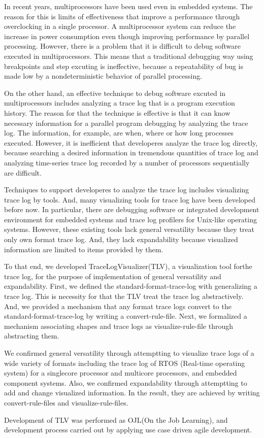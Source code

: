 In recent years, multiprocessors have been used even in embedded systems.
The reason for this is limits of effectiveness that improve a performance through overclocking in a single processor.
A multiprocessor system can reduce the increase in power consumption even though improving performance by parallel processing.
However, there is a problem that it is difficult to debug software executed in multiprocessors.
This means that a traditional debugging way using breakpoints and step excuting is ineffective, because a repeatability of bug is made low by a nondeterministic behavior of parallel processing.

On the other hand, an effective technique to debug software excuted in multiprocessors includes analyzing a trace log that is a program execution history.
The reason for that the technique is effective is that it can know necessary information for a parallel program debugging by analyzing the trace log.
The information, for example, are when, where or how long processes executed.
However, it is inefficient that developeres analyze the trace log directly, because searching a desired information in tremendous quantities of trace log and analyzing time-series trace log recorded by a number of processors sequentially are difficult.

Techniques to support developeres to analyze the trace log includes visualizing trace log by tools.
And, many visualizing tools for trace log have been developed before now.
In particular, there are debugging software or integrated development environment for embedded systems and trace log profilers for Unix-like operating systems.
However, these existing tools lack general versatility because they treat only own format trace log. 
And, they lack expandability because visualized information are limited to items provided by them.

To that end, we developed TraceLogVisualizer(TLV), a visualization tool forthe trace log, for the purpose of implementation of general versatility and expandability.
First, we defined the standard-format-trace-log with generalizing a trace log.
This is necessity for that the TLV treat the trace log abstractively.
And, we provided a mechanism that any format trace logs convert to the standard-format-trace-log by writing a convert-rule-file.
Next, we formalized a mechanism associating shapes and trace logs as visualize-rule-file through abstracting them.

We confirmed general versatility through attemptting to visualize trace logs of a wide variety of formats including the trace log of RTOS (Real-time operating system) for a singlecore processor and multicore processors, and embedded component systems.
Also, we confirmed expandability through attemptting to add and change visualized information.
In the result, they are achieved by writing convert-rule-files and visualize-rule-files.

Development of TLV was performed as OJL(On the Job Learning), and development process carried out by applying use case driven agile development.
